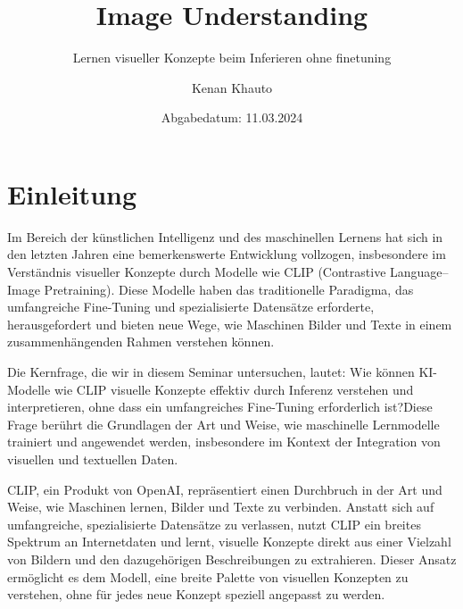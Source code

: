 \documentclass[nolibertine, ngerman, algorithm, nomencl, minted]{ttlab-qualify}
\begin{document}
\titlehead{
  Kenan Khauto\\
  7592047\\
  B.Sc Informatik\\
  6\\
  kenan.khauto@stud.uni-frankfurt.de 
}
\subject{Seminararbeit Text Analytics}
\author{Kenan Khauto}
\title{Image Understanding}
\subtitle{Lernen visueller Konzepte beim Inferieren ohne finetuning}
\date{Abgabedatum: 11.03.2024}
\publishers{Goethe-Universität Frankfurt am Main\\Prof. Alexander Mehler}

\maketitle


\tableofcontents

\chapter{Einleitung}
Im Bereich der künstlichen Intelligenz und des maschinellen Lernens hat sich in den letzten Jahren eine bemerkenswerte Entwicklung 
vollzogen, insbesondere im Verständnis visueller Konzepte durch Modelle wie CLIP (Contrastive Language–Image Pretraining). 
Diese Modelle haben das traditionelle Paradigma, das umfangreiche Fine-Tuning und spezialisierte Datensätze erforderte, herausgefordert 
und bieten neue Wege, wie Maschinen Bilder und Texte in einem zusammenhängenden Rahmen verstehen können.


Die Kernfrage, die wir in diesem Seminar untersuchen, lautet: \glqq Wie können KI-Modelle wie CLIP visuelle Konzepte effektiv durch 
Inferenz verstehen und interpretieren, ohne dass ein umfangreiches Fine-Tuning erforderlich ist?\grqq Diese Frage berührt die Grundlagen 
der Art und Weise, wie maschinelle Lernmodelle trainiert und angewendet werden, insbesondere im Kontext der Integration von visuellen und 
textuellen Daten.


CLIP, ein Produkt von OpenAI, repräsentiert einen Durchbruch in der Art und Weise, wie Maschinen lernen, Bilder und Texte zu verbinden. 
Anstatt sich auf umfangreiche, spezialisierte Datensätze zu verlassen, nutzt CLIP ein breites Spektrum an Internetdaten und lernt, 
visuelle Konzepte direkt aus einer Vielzahl von Bildern und den dazugehörigen Beschreibungen zu extrahieren. Dieser Ansatz ermöglicht 
es dem Modell, eine breite Palette von visuellen Konzepten zu verstehen, ohne für jedes neue Konzept speziell angepasst zu werden.
\end{document}
